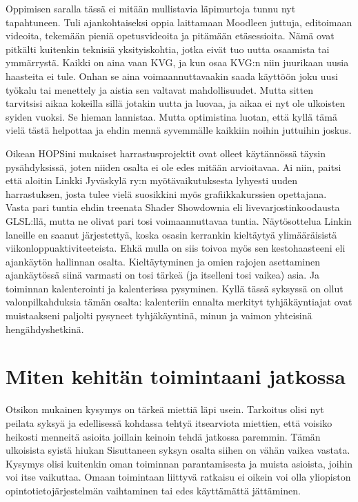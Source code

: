 \documentclass[utf8]{gradu3}
\begin{document}
Oppimisen saralla tässä ei mitään mullistavia läpimurtoja tunnu nyt tapahtuneen.
Tuli ajankohtaiseksi oppia laittamaan Moodleen juttuja, editoimaan videoita,
tekemään pieniä opetusvideoita ja pitämään etäsessioita. Nämä ovat pitkälti
kuitenkin teknisiä yksityiskohtia, jotka eivät tuo uutta osaamista tai
ymmärrystä. Kaikki on aina vaan KVG, ja kun osaa KVG:n niin juurikaan uusia
haasteita ei tule.
%
Onhan se aina voimaannuttavaakin saada käyttöön joku uusi työkalu tai menettely
ja aistia sen valtavat mahdollisuudet. Mutta sitten tarvitsisi aikaa kokeilla
sillä jotakin uutta ja luovaa, ja aikaa ei nyt ole ulkoisten syiden vuoksi. Se
hieman lannistaa. Mutta optimistina luotan, että kyllä tämä vielä tästä
helpottaa ja ehdin mennä syvemmälle kaikkiin noihin juttuihin joskus.

Oikean HOPSini mukaiset harrastusprojektit ovat olleet käytännössä täysin
pysähdyksissä, joten niiden osalta ei ole edes mitään arvioitavaa. Ai niin,
paitsi että aloitin Linkki Jyväskylä ry:n myötävaikutuksesta lyhyesti uuden
harrastuksen, josta tulee vielä suosikkini myös grafiikkakurssien opettajana.
Vasta pari tuntia ehdin treenata Shader Showdownia eli livevarjostinkoodausta
GLSL:llä, mutta ne olivat pari tosi voimaannuttavaa tuntia. Näytösottelua Linkin
laneille en saanut järjestettyä, koska osasin kerrankin kieltäytyä
ylimääräisistä viikonloppuaktiviteeteista. Ehkä mulla on siis toivoa myös sen
kestohaasteeni eli ajankäytön hallinnan osalta. Kieltäytyminen ja omien rajojen
asettaminen ajankäytössä siinä varmasti on tosi tärkeä (ja itselleni tosi
vaikea) asia. Ja toiminnan kalenterointi ja kalenterissa pysyminen. Kyllä tässä
syksyssä on ollut valonpilkahduksia tämän osalta: kalenteriin ennalta merkityt
tyhjäkäyntiajat ovat muistaakseni paljolti pysyneet tyhjäkäyntinä, minun ja
vaimon yhteisinä hengähdyshetkinä.



\section{Miten kehitän toimintaani jatkossa}

Otsikon mukainen kysymys on tärkeä miettiä läpi usein.  Tarkoitus olisi nyt
peilata syksyä ja edellisessä kohdassa tehtyä itsearviota miettien, että voisiko
heikosti menneitä asioita joillain keinoin tehdä jatkossa paremmin. Tämän
ulkoisista syistä hiukan Sisuttaneen syksyn osalta siihen on vähän vaikea
vastata. Kysymys olisi kuitenkin oman toiminnan parantamisesta ja muista
asioista, joihin voi itse vaikuttaa. Omaan toimintaan liittyvä ratkaisu ei
oikein voi olla yliopiston opintotietojärjestelmän vaihtaminen tai edes
käyttämättä jättäminen.
\end{document}
